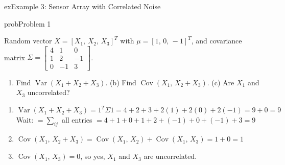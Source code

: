 \begin{PSbox}[breakable]{ex}{Example 3: Sensor Array with Correlated Noise}
\begin{Shaded}
\begin{Highlighting}[]
 \OperatorTok{=} \OperatorTok{;}
 \OperatorTok{=} \OperatorTok{\textquotesingle{}} \OperatorTok{*} \OperatorTok{;}
 \OperatorTok{=} \OperatorTok{\^{}} \OperatorTok{/}\NormalTok{ (}\OperatorTok{\textquotesingle{}*}\OperatorTok{*}\NormalTok{)}\OperatorTok{;}
\NormalTok{(}\OperatorTok{,} \OperatorTok{,} \OperatorTok{*}\NormalTok{(}\NormalTok{))}\OperatorTok{;}
\end{Highlighting}
\end{Shaded}

\end{PSbox}


\begin{PSbox}[unbreakable]{prob}{Problem 1}

Random vector $X = [X_{1},\, X_{2},\, X_{3}]^{T}$ with $\mu = [1,\, 0,\, -1]^{T}$, and covariance matrix $\Sigma = \begin{bmatrix} 4 & 1 & 0 \\ 1 & 2 & -1 \\ 0 & -1 & 3 \end{bmatrix}$.

\begin{enumerate}
\def\labelenumi{(\alph{enumi})}
\tightlist
\item
  Find $\operatorname{Var}(X_{1} + X_{2} + X_{3})$. (b) Find $\operatorname{Cov}(X_{1},\, X_{2}+X_{3})$. (c) Are $X_{1}$ and $X_{3}$ uncorrelated?
\end{enumerate}

\PSsolution{} 

\begin{enumerate}
\def\labelenumi{(\alph{enumi})}
\tightlist
\item
  $\operatorname{Var}(X_{1}+X_{2}+X_{3}) = 1^{T}\Sigma 1 = 4+2+3 + 2(1) + 2(0) + 2(-1) = 9 + 0 = 9$\PSbr{}Wait: $= \sum_{ij}$ all entries $= 4+1+0+1+2+(-1)+0+(-1)+3 = 9$
\item
  $\operatorname{Cov}(X_{1},\, X_{2}+X_{3}) = \operatorname{Cov}(X_{1},\,X_{2}) + \operatorname{Cov}(X_{1},\,X_{3}) = 1 + 0 = 1$
\item
  $\operatorname{Cov}(X_{1},\,X_{3}) = 0$, so yes, $X_{1}$ and $X_{3}$ are uncorrelated.
\end{enumerate}

\end{PSbox}

